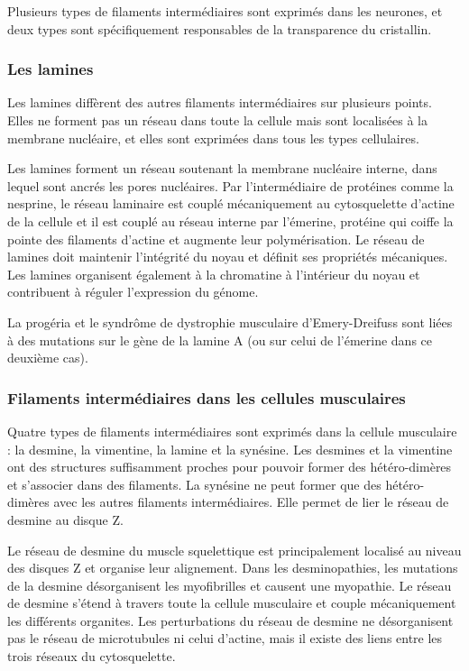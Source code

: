 \documentclass{report}
\begin{document}
Plusieurs types de filaments intermédiaires sont exprimés dans les neurones, et deux types sont spécifiquement responsables de la transparence du cristallin. 

\subsubsection{Les lamines}

Les lamines diffèrent des autres filaments intermédiaires sur plusieurs points. Elles ne forment pas un réseau dans toute la cellule mais sont localisées à la membrane nucléaire, et elles sont exprimées dans tous les types cellulaires. 

Les lamines forment un réseau soutenant la membrane nucléaire interne, dans lequel sont ancrés les pores nucléaires. Par l'intermédiaire de protéines comme la nesprine, le réseau laminaire est couplé mécaniquement au cytosquelette d'actine de la cellule et il est couplé au réseau interne par l'émerine, protéine qui coiffe la pointe des filaments d'actine et augmente leur polymérisation. 
Le réseau de lamines doit maintenir l'intégrité du noyau et définit ses propriétés mécaniques. 
Les lamines organisent également à la chromatine à l'intérieur du noyau et contribuent à réguler l'expression du génome. 

La progéria et le syndrôme de dystrophie musculaire d'Emery-Dreifuss sont liées à des mutations sur le gène de la lamine A (ou sur celui de l'émerine dans ce deuxième cas). 


\subsubsection{Filaments intermédiaires dans les cellules musculaires}

Quatre types de filaments intermédiaires sont exprimés dans la cellule musculaire : la desmine, la vimentine, la lamine et la synésine. 
Les desmines et la vimentine ont des structures suffisamment proches pour pouvoir former des hétéro-dimères et s'associer dans des filaments. La synésine ne peut former que des hétéro-dimères avec les autres filaments intermédiaires. Elle permet de lier le réseau de desmine au disque Z. 

Le réseau de desmine du muscle squelettique est principalement localisé au niveau des disques Z et organise leur alignement. Dans les desminopathies, les mutations de la desmine désorganisent les myofibrilles et causent une myopathie. 
Le réseau de desmine s'étend à travers toute la cellule musculaire et couple mécaniquement les différents organites. 
Les perturbations du réseau de desmine ne désorganisent pas le réseau de microtubules ni celui d'actine, mais il existe des liens entre les trois réseaux du cytosquelette. 
\end{document}
